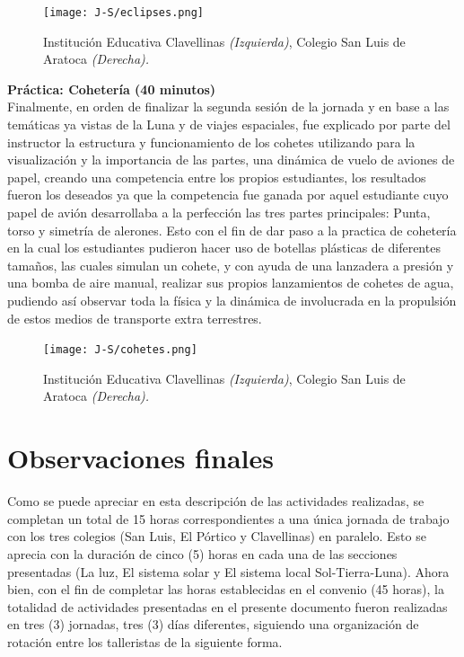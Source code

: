 \documentclass[a4paper,10pt]{article}
\begin{document}
\begin{figure}[H]
    \centering
    \texttt{[image: J-S/eclipses.png]}
    \caption{Institución Educativa Clavellinas \textit{(Izquierda)}, Colegio San Luis de Aratoca \textit{(Derecha).}}
    \label{fig: Luna}
\end{figure}



\noindent \textbf{Práctica: Cohetería (40 minutos)}\\


\noindent Finalmente, en orden de finalizar la segunda sesión de la jornada y en base a las temáticas ya vistas de la Luna y de viajes espaciales, fue explicado por parte del instructor la estructura y funcionamiento de los cohetes utilizando para la visualización y la importancia de las partes, una dinámica de vuelo de aviones de papel, creando una competencia entre los propios estudiantes, los resultados fueron los deseados ya que la competencia fue ganada por aquel estudiante cuyo papel de avión desarrollaba a la perfección las tres partes principales: Punta, torso y simetría de alerones. Esto con el fin de dar paso a la practica de cohetería en la cual los estudiantes pudieron hacer uso de botellas plásticas de diferentes tamaños, las cuales simulan un cohete, y con ayuda de una lanzadera a presión y una bomba de aire manual, realizar sus propios lanzamientos de cohetes de agua, pudiendo así observar toda la física y la dinámica de involucrada en la propulsión de estos medios de transporte extra terrestres.


\begin{figure}[H]
    \centering
    \texttt{[image: J-S/cohetes.png]}
    \caption{Institución Educativa Clavellinas \textit{(Izquierda)}, Colegio San Luis de Aratoca \textit{(Derecha).}}
    \label{fig: Luna}
\end{figure}


\section{Observaciones finales}

\noindent Como se puede apreciar en esta descripción de las actividades realizadas, se completan un total de 15 horas correspondientes a una única jornada de trabajo con los tres colegios (San Luis, El Pórtico y Clavellinas) en paralelo. Esto se aprecia con la duración de cinco (5) horas en cada una de las secciones presentadas (La luz, El sistema solar y El sistema local Sol-Tierra-Luna). Ahora bien, con el fin de completar las horas establecidas en el convenio (45 horas), la totalidad de actividades presentadas en el presente documento fueron realizadas en tres (3) jornadas, tres (3) días diferentes, siguiendo una organización de rotación entre los talleristas de la siguiente forma.
\end{document}

